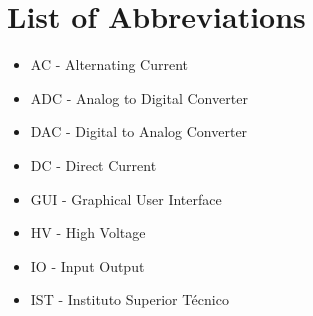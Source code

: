 \chapter*{List of Abbreviations}

\begin{itemize}
\item AC - Alternating Current
\item ADC - Analog to Digital Converter
\item DAC - Digital to Analog Converter
\item DC - Direct Current
\item GUI - Graphical User Interface
\item HV - High Voltage
\item IO - Input Output
\item IST - Instituto Superior Técnico 
\end{itemize}


